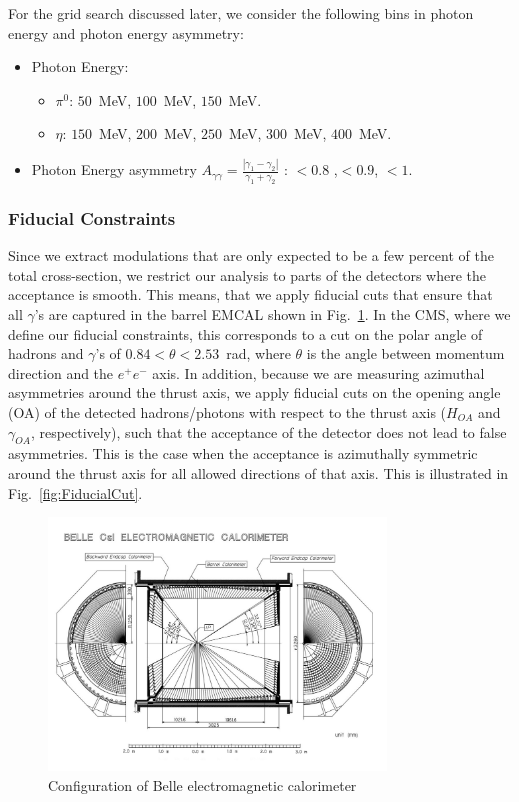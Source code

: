 For the grid search discussed later, we consider the following bins in photon energy and photon energy asymmetry:
\begin{itemize}
  \item Photon Energy:
    \begin{itemize}
      \item $\pi^{0}$: $50$~MeV, $100$~MeV, $150$~MeV. 
      \item $\eta$: $150$~MeV, $200$~MeV, $250$~MeV, $300$~MeV, $400$~MeV. 
    \end{itemize}
  \item Photon Energy asymmetry $A_{\gamma\gamma}=\frac{|\gamma_1-\gamma_2|}{\gamma_1+\gamma_2}$ : $<0.8$ ,$<0.9$, $<1$.
\end{itemize}

\label{sec:energyconstraint}


\subsubsection{Fiducial Constraints}
\label{sec:fiducialcut}
Since we extract modulations that are only expected to be a few percent of the total cross-section, we restrict our analysis to parts of the detectors where the acceptance is smooth. This means, that we apply fiducial cuts that ensure that all $\gamma$'s are captured in the barrel EMCAL shown in Fig.~\ref{fig:2}. In the CMS, where we define our fiducial constraints, this corresponds to a cut on the polar angle of  hadrons and $\gamma$'s of $0.84<\theta<2.53$~rad, where $\theta$ is the angle between momentum direction and the $e^+e^-$ axis.
  In addition, because we are measuring azimuthal asymmetries around the thrust axis, we apply fiducial cuts on the opening angle (OA) of the detected hadrons/photons with respect to the thrust axis ($H_{OA}$ and $\gamma_{OA}$, respectively), such that the acceptance of the detector does not lead to false asymmetries. This is the case when the acceptance is azimuthally symmetric around the thrust axis for all allowed directions of that axis. This is illustrated in Fig.~\ref{fig:FiducialCut}. 

\begin{figure}[H]
  \centering
  \includegraphics[width=0.8\textwidth,natwidth=610,natheight=642]{figure_dataselection/EMCAL.pdf}
  \caption{Configuration of Belle electromagnetic calorimeter~\cite{BelleDetector}}
  \label{fig:2}
\end{figure}

